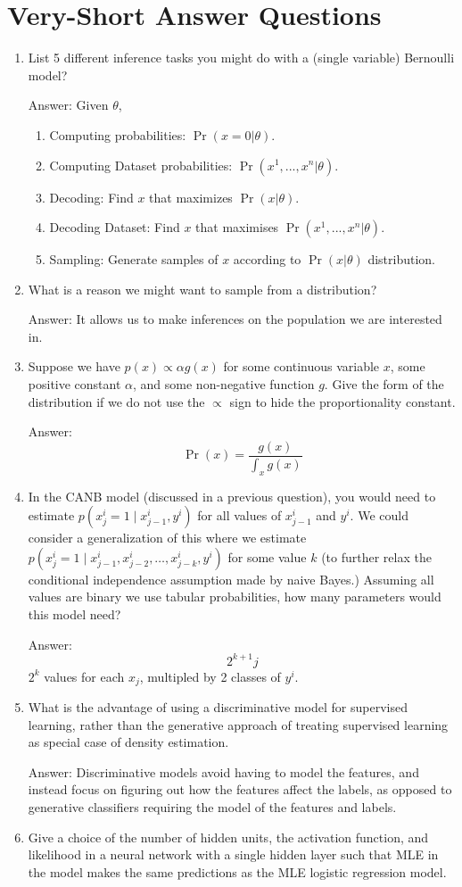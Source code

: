 \documentclass{article}
\def\ans#1{\par\gre{Answer: #1}}
\def\gre#1{{\color{gre}#1}}
\def\cond{\; | \;}
\def\enum#1{\begin{enumerate}#1\end{enumerate}}
\begin{document}
\section{Very-Short Answer Questions}


\enum{ 
\item List 5 different inference tasks you might do with a (single variable) Bernoulli model?
\ans{
Given $\theta$,
\enum{
    \item Computing probabilities: $\Pr(x=0|\theta)$.
    \item Computing Dataset probabilities: $\Pr(x^1,...,x^n|\theta)$.
    \item Decoding: Find $x$ that maximizes $\Pr(x|\theta)$.
    \item Decoding Dataset: Find $x$ that maximises $\Pr(x^1,...,x^n|\theta)$.
    \item Sampling: Generate samples of $x$ according to $\Pr(x|\theta)$ distribution.
}
}
\item What is a reason we might want to sample from a distribution?
\ans{It allows us to make inferences on the population we are interested in.}
\item Suppose we have $p(x) \propto \alpha g(x)$ for some continuous variable $x$, some positive constant $\alpha$, and some non-negative function $g$. Give the form of the distribution if we do not use the $\propto$ sign to hide the proportionality constant.
\ans{
\[\Pr(x)=\frac{g(x)}{\int_x g(x)}\]
}
\item In the CANB model (discussed in a previous question), you would need to estimate $p(x_j^i = 1 \cond x_{j-1}^i, y^i)$ for all values of $x_{j-1}^i$ and $y^i$.  We could consider a generalization of this where we estimate $p(x_j^i = 1 \cond x_{j-1}^i, x_{j-2}^i,\dots, x_{j-k}^i, y^i)$ for some value $k$ (to further relax the conditional independence assumption made by naive Bayes.) Assuming all values are binary we use tabular probabilities, how many parameters would this model need?
\ans{
\[2^{k+1} j\]
$2^k$ values for each $x_j$, multipled by 2 classes of $y^i$.
}
\item What is the advantage of using a discriminative model for supervised learning, rather than the generative approach of treating supervised learning as special case of density estimation.
\ans{
Discriminative models avoid having to model the features, and instead focus on figuring out how the features affect the labels, as opposed to generative classifiers requiring the model of the features and labels.
}
\pagebreak
\item Give a choice of the number of hidden units, the activation function, and likelihood in a neural network with a single hidden layer such that MLE in the model makes the same predictions as the MLE logistic regression model.
}
\end{document}
